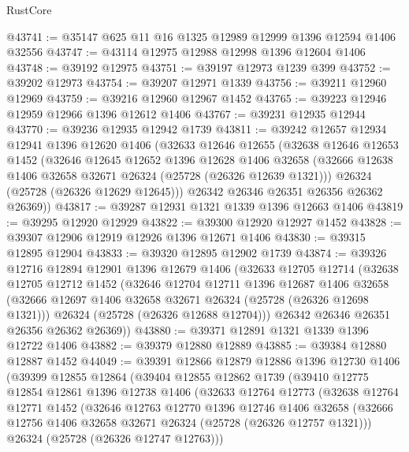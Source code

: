 \begin{lexlean}{RustCore}
\begin{coremodule}
@43741 := @35147 @625 @11 @16 @1325 @12989 @12999 @1396 @12594 @1406 @32556
@43747 := @43114 @12975 @12988 @12998 @1396 @12604 @1406
@43748 := @39192 @12975
@43751 := @39197 @12973 @1239 @399
@43752 := @39202 @12973
@43754 := @39207 @12971 @1339
@43756 := @39211 @12960 @12969
@43759 := @39216 @12960 @12967 @1452
@43765 := @39223 @12946 @12959 @12966 @1396 @12612 @1406
@43767 := @39231 @12935 @12944
@43770 := @39236 @12935 @12942 @1739
@43811 := @39242
    @12657
    @12934
    @12941
    @1396
    @12620
    @1406
    (@32633
      @12646
      @12655
      (@32638
        @12646
        @12653
        @1452
        (@32646
          @12645
          @12652
          @1396
          @12628
          @1406
          @32658
          (@32666 @12638 @1406 @32658 @32671 @26324 (@25728 (@26326 @12639 @1321)))
          @26324
          (@25728 (@26326 @12629 @12645)))
        @26342
        @26346
        @26351
        @26356
        @26362
        @26369))
@43817 := @39287 @12931 @1321 @1339 @1396 @12663 @1406
@43819 := @39295 @12920 @12929
@43822 := @39300 @12920 @12927 @1452
@43828 := @39307 @12906 @12919 @12926 @1396 @12671 @1406
@43830 := @39315 @12895 @12904
@43833 := @39320 @12895 @12902 @1739
@43874 := @39326
    @12716
    @12894
    @12901
    @1396
    @12679
    @1406
    (@32633
      @12705
      @12714
      (@32638
        @12705
        @12712
        @1452
        (@32646
          @12704
          @12711
          @1396
          @12687
          @1406
          @32658
          (@32666 @12697 @1406 @32658 @32671 @26324 (@25728 (@26326 @12698 @1321)))
          @26324
          (@25728 (@26326 @12688 @12704)))
        @26342
        @26346
        @26351
        @26356
        @26362
        @26369))
@43880 := @39371 @12891 @1321 @1339 @1396 @12722 @1406
@43882 := @39379 @12880 @12889
@43885 := @39384 @12880 @12887 @1452
@44049 := @39391
    @12866
    @12879
    @12886
    @1396
    @12730
    @1406
    (@39399
      @12855
      @12864
      (@39404
        @12855
        @12862
        @1739
        (@39410
          @12775
          @12854
          @12861
          @1396
          @12738
          @1406
          (@32633
            @12764
            @12773
            (@32638
              @12764
              @12771
              @1452
              (@32646
                @12763
                @12770
                @1396
                @12746
                @1406
                @32658
                (@32666 @12756 @1406 @32658 @32671 @26324 (@25728 (@26326 @12757 @1321)))
                @26324
                (@25728 (@26326 @12747 @12763)))

\end{coremodule}
\end{lexlean}
